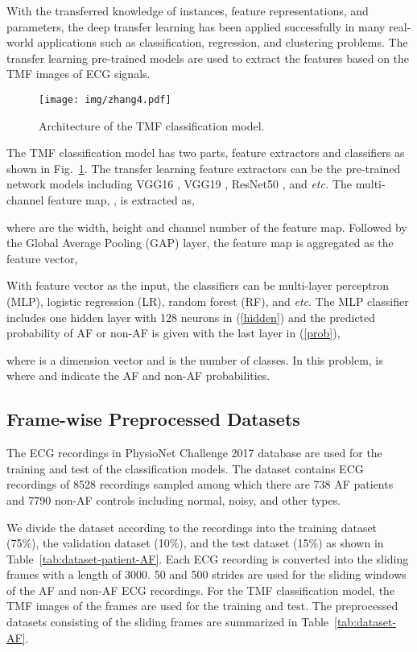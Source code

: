 \documentclass[journal]{IEEEtran}
\begin{document}
With the transferred knowledge of instances, feature representations, and parameters, the deep transfer learning\cite{survey_tranfer_2010,transfer_2014} has been applied successfully in many real-world applications such as classification, regression, and clustering problems. The transfer learning pre-trained models are used to extract the features based on the TMF images of ECG signals. 

\begin{figure}[H]
  \centering
  \texttt{[image: img/zhang4.pdf]}
  \caption{Architecture of the TMF classification model.}
  \label{fig:network}
\end{figure}

The TMF classification model has two parts, feature extractors and classifiers as shown in Fig.~\ref{fig:network}. The transfer learning feature extractors can be the pre-trained network models  including VGG16 \cite{vgg_2015}, VGG19 \cite{vgg_2015}, ResNet50 \cite{ResNet_2016}, and {\it etc.} The multi-channel feature map, , is extracted as,

where  are the width, height and channel number of the feature map. Followed by the Global Average Pooling (GAP) layer, the feature map  is aggregated as the feature vector,

With feature vector as the input, the classifiers can be multi-layer perceptron (MLP), logistic regression (LR), random forest (RF), and {\it etc}.
The MLP classifier includes one hidden layer with 128 neurons in (\ref{hidden}) and the predicted probability  of AF or non-AF is given with the last layer in (\ref{prob}),


where  is a  dimension vector and  is the number of classes. In this problem,  is  where  and  indicate the AF and non-AF probabilities.


\subsection{Frame-wise Preprocessed Datasets}

The ECG recordings in PhysioNet Challenge 2017 database \cite{standard_database_2000,clifford_AF_2017} are used for the training and test of the classification models. The dataset contains ECG recordings of 8528 recordings sampled among which there are 738 AF patients and 7790 non-AF controls including normal, noisy, and other types. 

We divide the dataset according to the recordings into the training dataset (75\%), the validation dataset (10\%), and the test dataset (15\%) as shown in Table~\ref{tab:dataset-patient-AF}. Each ECG recording is converted into the sliding frames with a length of 3000. 50 and 500 strides are used for the sliding windows of the AF and non-AF ECG recordings. For the TMF classification model, the TMF images of the frames are used for the training and test. The preprocessed datasets consisting of the sliding frames are summarized in Table~\ref{tab:dataset-AF}.
\end{document}
